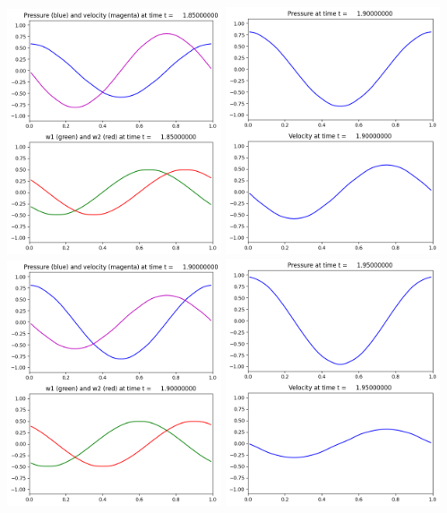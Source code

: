 \documentclass[11pt]{article}
\begin{document}
\includegraphics[width=0.475\textwidth]{frame0037fig2.png}
\vskip 10pt 
\includegraphics[width=0.475\textwidth]{frame0038fig1.png}
\includegraphics[width=0.475\textwidth]{frame0038fig2.png}
\vskip 10pt 
\includegraphics[width=0.475\textwidth]{frame0039fig1.png}
\end{document}
